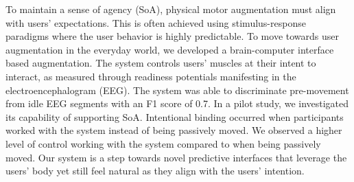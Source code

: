 To maintain a sense of agency (SoA), physical motor augmentation must align with users' expectations. This is often achieved using stimulus-response paradigms where the user behavior is highly predictable. To move towards user augmentation in the everyday world, we developed a brain-computer interface based augmentation. The system controls users' muscles at their intent to interact, as measured through readiness potentials manifesting in the electroencephalogram (EEG). The system was able to discriminate pre-movement from idle EEG segments with an F1 score of 0.7. In a pilot study, we investigated its capability of supporting SoA. Intentional binding occurred when participants worked with the system instead of being passively moved. We observed a higher level of control working with the system compared to when being passively moved. Our system is a step towards novel predictive interfaces that leverage the users’ body yet still feel natural as they align with the users’ intention.







